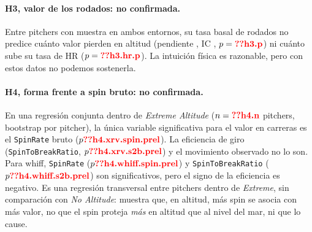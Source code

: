 \documentclass[10pt]{article}
\begin{document}
\paragraph{H3, valor de los rodados: no confirmada.} Entre  pitchers con muestra en ambos entornos, su tasa basal de rodados no predice cuánto valor pierden en altitud (pendiente , IC , $p=\cf{h3.p}$) ni cuánto sube su tasa de HR ($p=\cf{h3.hr.p}$). La intuición física es razonable, pero con estos datos no podemos sostenerla.

\paragraph{H4, forma frente a spin bruto: no confirmada.} En una regresión conjunta dentro de \emph{Extreme Altitude} ($n=\cf{h4.n}$ pitchers, bootstrap por pitcher), la única variable significativa para el valor en carreras es el \texttt{SpinRate} bruto ($p\cf{h4.xrv.spin.prel}$). La eficiencia de giro (\texttt{SpinToBreakRatio}, $p\cf{h4.xrv.s2b.prel}$) y el movimiento observado no lo son. Para whiff, \texttt{SpinRate} ($p\cf{h4.whiff.spin.prel}$) y \texttt{SpinToBreakRatio} ($p\cf{h4.whiff.s2b.prel}$) son significativos, pero el signo de la eficiencia es negativo. Es una regresión transversal entre pitchers dentro de \emph{Extreme}, sin comparación con \emph{No Altitude}: muestra que, en altitud, más spin se asocia con más valor, no que el spin proteja \emph{más} en altitud que al nivel del mar, ni que lo cause.

\begin{table}[htbp]\centering\small
\caption{H4: regresión conjunta en \emph{Extreme Altitude} con IC bootstrap por pitcher.}\label{tab:h4}
\end{table}
\end{document}
